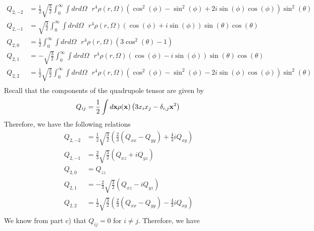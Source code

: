 \documentclass[]{article}
\begin{document}
\begin{enumerate}[c)]
\begin{equation}
\begin{split}
Q_{2,-2} & = \frac{1}{2}\sqrt{\frac{3}{2}} \int_{0}^{\infty}\int dr d\Omega \text{ } r^4 \rho(r,\Omega)\left( \cos^2(\phi) - \sin^2(\phi) + 2i \sin(\phi)\cos(\phi) \right)\sin ^2(\theta ) \\
Q_{2,-1} & = \sqrt{\frac{3}{2}}  \int_{0}^{\infty}\int dr d\Omega \text{ }  r^4 \rho(r,\Omega)\left(  \cos(\phi) +i \sin(\phi)\right)\sin (\theta ) \cos (\theta )\\
Q_{2,0} & = \frac{1}{2}\int_{0}^{\infty}\int dr d\Omega \text{ } r^4 \rho(r,\Omega)  \left(3 \cos ^2(\theta )-1\right) \\
Q_{2,1} & = -\sqrt{\frac{3}{2}} \int_{0}^{\infty}\int dr d\Omega \text{ } r^4 \rho(r,\Omega)\left(  \cos(\phi)  - i \sin(\phi)\right) \sin (\theta ) \cos (\theta )\\
Q_{2,2} & =  \frac{1}{2}\sqrt{\frac{3}{2}}\int_{0}^{\infty}\int dr d\Omega \text{ } r^4 \rho(r,\Omega)\left( \cos^2(\phi) - \sin^2(\phi) - 2i \sin(\phi)\cos(\phi) \right)\sin ^2(\theta ) \\
\end{split}
\end{equation}
Recall that the components of the quadrupole tensor are given by
\begin{equation}
Q_{ij} = \frac{1}{2}\int d\textbf{x} \rho(\textbf{x}) \left(3x_ix_j -\delta_{i,j}\textbf{x}^2\right) \\
\end{equation}
Therefore, we have the following relations
\begin{equation}
\begin{split}
Q_{2,-2} & = \frac{1}{2}\sqrt{\frac{3}{2}} \left( \frac{2}{3}(Q_{xx}  - Q_{yy} )+ \frac{4}{3}iQ_{xy}\right) \\
Q_{2,-1} & = \frac{2}{3} \sqrt{\frac{3}{2}}\left(  Q_{xz} + iQ_{yz} \right)  \\
Q_{2,0} & = Q_{zz}\\
Q_{2,1} & = - \frac{2}{3} \sqrt{\frac{3}{2}}\left(  Q_{xz} - iQ_{yz} \right)  \\
Q_{2,2} & =  \frac{1}{2}\sqrt{\frac{3}{2}}  \left(  \frac{2}{3}(Q_{xx}  - Q_{yy}) -\frac{4}{3}iQ_{xy}\right) \\
\end{split}
\end{equation}
We know from part c) that $Q_{ij}=0$ for $i \ne j$. Therefore, we have
\begin{equation}
\begin{split}

\end{split}
\end{equation}
\end{enumerate}
\end{document}

